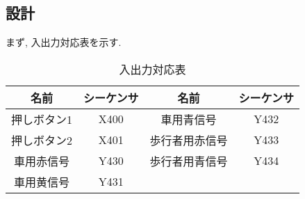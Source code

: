 \documentclass[titlepage]{jsarticle}
\begin{document}
  \subsection{設計}
    まず, 入出力対応表を示す.
    \begin{table}[h]
      \caption{入出力対応表}
      \centering
      \begin{tabular}{c|c||c|c}
        \hline
        名前 &       シーケンサ & 名前 &         シーケンサ \\ \hline \hline
        押しボタン1 & X400 &     車用青信号 &    Y432 \\
        押しボタン2 & X401 &     歩行者用赤信号 & Y433 \\
        車用赤信号 &  Y430 &     歩行者用青信号 & Y434 \\
        車用黄信号 &  Y431 & & \\ \hline
      \end{tabular}
    \end{table}
\end{document}
